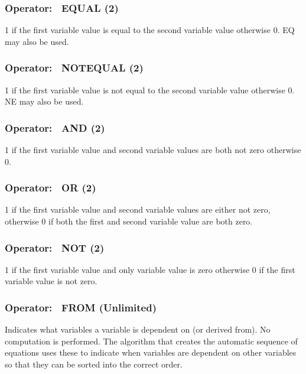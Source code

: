\subsubsection{Operator:~ EQUAL (2)}\label{operator-equal-2}

1 if the first variable value is equal to the second variable value otherwise 0. EQ may also be used.

\subsubsection{Operator:~ NOTEQUAL (2)}\label{operator-notequal-2}

1 if the first variable value is not equal to the second variable value otherwise 0. NE may also be used.

\subsubsection{Operator:~ AND (2)}\label{operator-and-2}

1 if the first variable value and second variable values are both not zero otherwise 0.

\subsubsection{Operator:~ OR (2)}\label{operator-or-2}

1 if the first variable value and second variable values are either not zero, otherwise 0 if both the first and second variable value are both zero.

\subsubsection{Operator:~ NOT (2)}\label{operator-not-2}

1 if the first variable value and only variable value is zero otherwise 0 if the first variable value is not zero.

\subsubsection{Operator:~ FROM (Unlimited)}\label{operator-from-unlimited}

Indicates what variables a variable is dependent on (or derived from). No computation is performed. The algorithm that creates the automatic sequence of equations uses these to indicate when variables are dependent on other variables so that they can be sorted into the correct order.